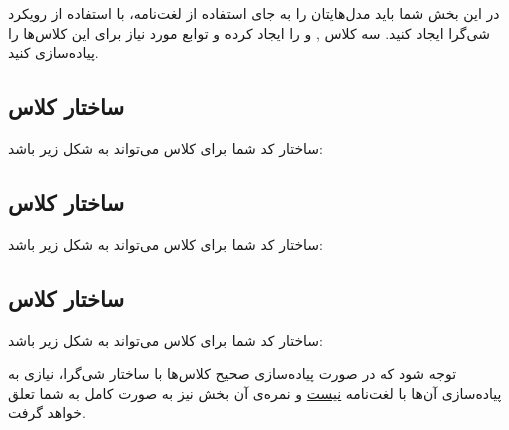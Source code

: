 در این بخش شما باید مدل‌هایتان را به جای استفاده از لغت‌نامه، با استفاده از رویکرد شی‌گرا ایجاد کنید. سه کلاس ,  و  را ایجاد کرده و توابع مورد نیاز برای این کلاس‌ها را پیاده‌سازی کنید.

\subsection{ساختار کلاس }

ساختار کد شما برای کلاس  می‌تواند به شکل زیر باشد:


\subsection{ساختار کلاس }

ساختار کد شما برای کلاس  می‌تواند به شکل زیر باشد:


\subsection{ساختار کلاس }

ساختار کد شما برای کلاس  می‌تواند به شکل زیر باشد:


توجه شود که در صورت پیاده‌سازی صحیح کلاس‌ها با ساختار شی‌گرا، نیازی به پیاده‌سازی آن‌ها با لغت‌نامه \underline{نیست} و نمره‌ی آن بخش نیز به صورت کامل به شما تعلق خواهد گرفت.